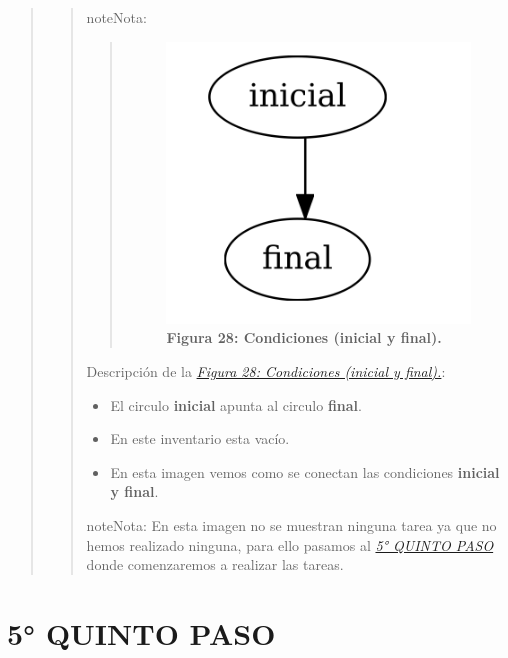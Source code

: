 \documentclass[letterpaper,11pt,spanish]{sphinxmanual}
\begin{document}
\begin{quote}
\begin{quote}
\begin{notice}{note}{Nota:}
\begin{quote}
\begin{figure}[htbp]
\includegraphics{grafo_inflow.png}
\caption{\textbf{Figura 28: Condiciones (inicial y final).}}\label{_templates/Contenido6/Parte4:figura28}\end{figure}
\end{quote}

Descripción de la {\hyperref[_templates/Contenido6/Parte4:figura28]{\emph{Figura 28: Condiciones (inicial y final).}}}:
\begin{itemize}
\item {} 
El circulo \textbf{inicial} apunta al circulo \textbf{final}.

\item {} 
En este inventario esta vacío.

\item {} 
En esta imagen vemos como se conectan las condiciones \textbf{inicial y final}.

\end{itemize}
\end{notice}

\begin{notice}{note}{Nota:}
En esta imagen no se muestran ninguna tarea ya que no hemos realizado ninguna, para ello pasamos al {\hyperref[_templates/Contenido6/Parte4:quintopaso]{\emph{5° QUINTO PASO}}} donde comenzaremos a realizar las tareas.
\end{notice}
\end{quote}
\end{quote}


\section{5° QUINTO PASO}
\label{_templates/Contenido6/Parte4:quintopaso}\label{_templates/Contenido6/Parte4:quinto-paso}
\end{document}
